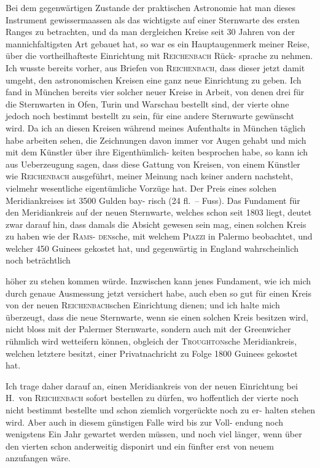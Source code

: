 \documentclass[12pt,a4paper]{article}
\theoremstyle{plain}
\theoremstyle{definition}
\theoremstyle{remark}
\begin{document}
Bei dem gegenw\"{a}rtigen Zustande der praktischen Astronomie hat man
dieses Instrument gewissermaassen als das wichtigste auf einer Sternwarte des
ersten Ranges zu betrachten, und da man dergleichen Kreise seit 30 Jahren
von der mannichfaltigsten Art gebauet hat, so war es ein Hauptaugenmerk
meiner Reise, \"{u}ber die vortheilhafteste Einrichtung mit \textsc{Reichenbach} R\"{u}ck-
sprache zu nehmen. Ich wusste bereits vorher, aus Briefen von \textsc{Reichenbach},
dass dieser jetzt damit umgeht, den astronomischen Kreisen eine ganz neue
Einrichtung zu geben. Ich fand in M\"{u}nchen bereits vier solcher neuer Kreise
in Arbeit, von denen drei f\"{u}r die Sternwarten in Ofen, Turin und Warschau
bestellt sind, der vierte ohne jedoch noch bestimmt bestellt zu sein, f\"{u}r eine
andere Sternwarte gew\"{u}nscht wird. Da ich an diesen Kreisen w\"{a}hrend meines
Aufenthalts in M\"{u}nchen t\"{a}glich habe arbeiten sehen, die Zeichnungen davon
immer vor Augen gehabt und mich mit dem K\"{u}nstler \"{u}ber ihre Eigenth\"{u}mlich-
keiten besprochen habe, so kann ich aus Ueberzeugung sagen, dass diese
Gattung von Kreisen, von einem K\"{u}nstler wie \textsc{Reichenbach} ausgef\"{u}hrt, meiner
Meinung nach keiner andern nachsteht, vielmehr wesentliche eigent\"{u}mliche
Vorz\"{u}ge hat. Der Preis eines solchen Meridiankreises ist 3500 Gulden bay-
risch (24 fl.\ -- Fuss). Das Fundament f\"{u}r den Meridiankreis auf der neuen
Sternwarte, welches schon seit 1803 liegt, deutet zwar darauf hin, dass damals
die Absicht gewesen sein mag, einen solchen Kreis zu haben wie der \textsc{Rams}-
\textsc{den}sche, mit welchem \textsc{Piazzi} in Palermo beobachtet, und welcher 450 Guinees
gekostet hat, und gegenw\"{a}rtig in England wahrscheinlich noch betr\"{a}chtlich

\newpage
\noindent
h\"{o}her zu stehen kommen w\"{u}rde. Inzwischen kann jenes Fundament, wie ich
mich durch genaue Ausmessung jetzt versichert habe, auch eben so gut f\"{u}r
einen Kreis von der neuen \textsc{Reichenbach}schen Einrichtung dienen; und ich
halte mich \"{u}berzeugt, dass die neue Sternwarte, wenn sie einen solchen Kreis
besitzen wird, nicht bloss mit der Palermer Sternwarte, sondern auch mit der
Greenwicher r\"{u}hmlich wird wetteifern k\"{o}nnen, obgleich der \textsc{Troughton}sche
Meridiankreis, welchen letztere besitzt, einer Privatnachricht zu Folge 1800
Guinees gekostet hat.

Ich trage daher darauf an, einen Meridiankreis von der neuen Einrichtung
bei H.\ von \textsc{Reichenbach} sofort bestellen zu d\"{u}rfen, wo hoffentlich der vierte
noch nicht bestimmt bestellte und schon ziemlich vorger\"{u}ckte noch zu er-
halten stehen wird. Aber auch in diesem g\"{u}nstigen Falle wird bis zur Voll-
endung noch wenigstens Ein Jahr gewartet werden m\"{u}ssen, und noch viel
l\"{a}nger, wenn \"{u}ber den vierten schon anderweitig disponirt und ein f\"{u}nfter
erst von neuem anzufangen w\"{a}re.
\end{document}
